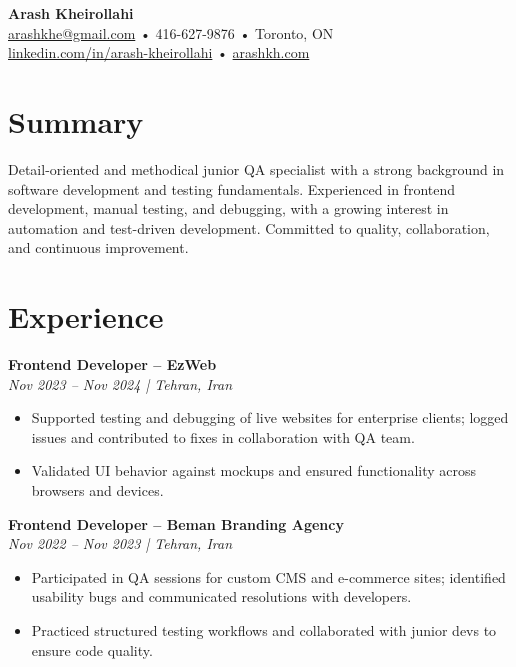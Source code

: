 \documentclass[letterpaper,11pt]{article}
\begin{document}

{\LARGE \textbf{Arash Kheirollahi}}\\
\href{mailto:arashkhe@gmail.com}{arashkhe@gmail.com} • 416-627-9876 • Toronto, ON\\
\href{https://linkedin.com/in/arash-kheirollahi}{linkedin.com/in/arash-kheirollahi} • \href{https://arashkh.com}{arashkh.com}

\vspace{1.2em}

\section*{Summary}
Detail-oriented and methodical junior QA specialist with a strong background in software development and testing fundamentals. Experienced in frontend development, manual testing, and debugging, with a growing interest in automation and test-driven development. Committed to quality, collaboration, and continuous improvement.

\vspace{0.6em}

\section*{Experience}
\textbf{Frontend Developer – EzWeb}\\
\textit{Nov 2023 -- Nov 2024 | Tehran, Iran}\\
\begin{itemize}[leftmargin=*]
  \item Supported testing and debugging of live websites for enterprise clients; logged issues and contributed to fixes in collaboration with QA team.
  \item Validated UI behavior against mockups and ensured functionality across browsers and devices.
\end{itemize}

\textbf{Frontend Developer – Beman Branding Agency}\\
\textit{Nov 2022 -- Nov 2023 | Tehran, Iran}\\
\begin{itemize}[leftmargin=*]
  \item Participated in QA sessions for custom CMS and e-commerce sites; identified usability bugs and communicated resolutions with developers.
  \item Practiced structured testing workflows and collaborated with junior devs to ensure code quality.
\end{itemize}
\end{document}
